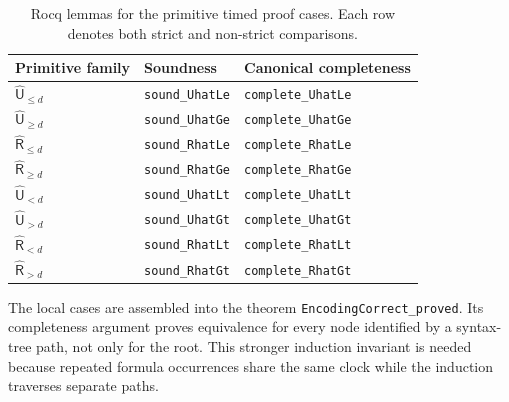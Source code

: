 \documentclass[10pt,journal,compsoc]{IEEEtran}
\newcommand{\hUntil}{\mathbin{\widehat{\mathsf{U}}}}
\newcommand{\hRelease}{\mathbin{\widehat{\mathsf{R}}}}
\begin{document}
\begin{table}[t]
\centering
\caption{Rocq lemmas for the primitive timed proof cases. Each row denotes
both strict and non-strict comparisons.}
\label{tab:primitive-proof-lemmas}
\footnotesize
\begin{tabular}{@{}lll@{}}
\toprule
Primitive family & Soundness & Canonical completeness\\
\midrule
$\hUntil_{\le d}$ & \texttt{sound\_UhatLe} & \texttt{complete\_UhatLe}\\
$\hUntil_{\ge d}$ & \texttt{sound\_UhatGe} & \texttt{complete\_UhatGe}\\
$\hRelease_{\le d}$ & \texttt{sound\_RhatLe} & \texttt{complete\_RhatLe}\\
$\hRelease_{\ge d}$ & \texttt{sound\_RhatGe} & \texttt{complete\_RhatGe}\\
$\hUntil_{<d}$ & \texttt{sound\_UhatLt} & \texttt{complete\_UhatLt}\\
$\hUntil_{>d}$ & \texttt{sound\_UhatGt} & \texttt{complete\_UhatGt}\\
$\hRelease_{<d}$ & \texttt{sound\_RhatLt} & \texttt{complete\_RhatLt}\\
$\hRelease_{>d}$ & \texttt{sound\_RhatGt} & \texttt{complete\_RhatGt}\\
\bottomrule
\end{tabular}
\end{table}

The local cases are assembled into the theorem
\texttt{EncodingCorrect\_proved}. Its completeness argument proves
equivalence for every node identified by a syntax-tree path, not only for
the root. This stronger induction invariant is needed because repeated
formula occurrences share the same clock while the induction traverses
separate paths.
\end{document}
